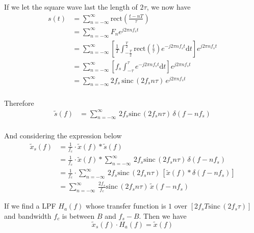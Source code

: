 \documentclass{article}
\begin{document}
If we let the square wave last the length of $2\tau$, we now have
\begin{equation}
    \begin{aligned}
        s(t) &= \sum_{n = -\infty}^{\infty} \mathrm{rect} (\frac{t - nT}{\tau}) \\
        &= \sum_{n = -\infty}^{\infty}F_n e^{j2 \pi n f_s t} \\
        &= \sum_{n = -\infty}^{\infty}\left[ \frac{1}{T} \int_{-\frac T2}^{\frac T2} \mathrm{rect}(\frac{t}{\tau}) e^{-j2 \pi n f_s t} \mathrm{d}t \right] e^{j2 \pi n f_s t} \\
        &= \sum_{n = -\infty}^{\infty}\left[ f_s \int_{-\tau}^{\tau} e^{-j2 \pi n f_s t} \mathrm{d}t \right] e^{j2 \pi n f_s t} \\
        &= \sum_{n = -\infty}^{\infty}2f_s\, \mathrm{sinc} \,( 2f_s n\tau)\, e^{j2 \pi n f_s t} \label{rect_st} \\
    \end{aligned}
\end{equation}

Therefore
\begin{equation}
    \begin{aligned}
        \widetilde{s}(f) &= \sum_{n = -\infty}^{\infty}\, 2f_s \mathrm{sinc}\, ( 2f_s n\tau)\, \delta(f - nf_s) \\
    \end{aligned}
\end{equation}

And considering the expression below
\begin{equation}
    \begin{aligned}
        \widetilde{x}_s(f) &= \frac{1}{f_c} \cdot \widetilde{x}(f) * \widetilde{s}(f)\\
        &= \frac{1}{f_c} \cdot \widetilde{x}(f) * \sum_{n = -\infty}^{\infty}\, 2f_s \mathrm{sinc}\, ( 2f_s n\tau)\, \delta(f - nf_s) \\
        &= \frac{1}{f_c} \cdot \sum_{n = -\infty}^{\infty}\, 2f_s \mathrm{sinc}\, ( 2f_s n\tau)\, \left[ \widetilde{x}(f) *\delta(f - nf_s) \right] \\
        &= \sum_{n = -\infty}^{\infty}\,\frac{2f_s}{f_c} \mathrm{sinc}\, ( 2f_s n\tau)\, \widetilde{x}(f - nf_s)
    \end{aligned}
\end{equation}

If we find a LPF $H_a(f)$ whose transfer function is $1$ over $[2f_s T \mathrm{sinc}\, ( 2f_s\tau)]$ and bandwidth $f_c$ is between $B$ and $f_s - B$. Then we have
\begin{equation}
    \widetilde{x}_s(f) \cdot H_a(f) = \widetilde{x}(f)
\end{equation}
\end{document}
